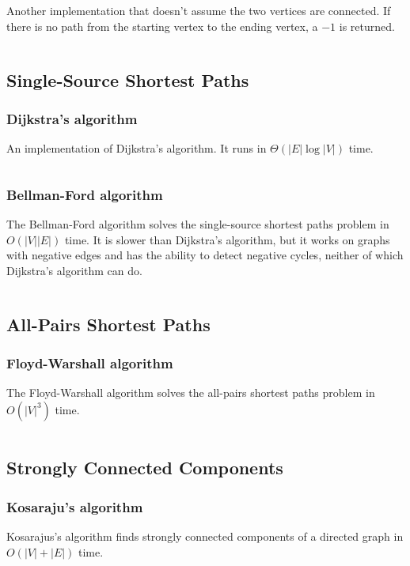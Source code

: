 \documentclass[9pt,a4paper,twocolumn,landscape,oneside]{amsart}
\newcommand{\code}[1]{\inputminted{cpp}{_code/#1}}
\begin{document}
        Another implementation that doesn't assume the two vertices are
        connected. If there is no path from the starting vertex to the ending
        vertex, a $-1$ is returned.
        \code{graph/bfs_visited.cpp}

    \subsection{Single-Source Shortest Paths}
        \subsubsection{Dijkstra's algorithm}
            An implementation of Dijkstra's algorithm. It runs in
            $\Theta(|E|\log{|V|})$ time.
            \code{graph/dijkstra.cpp}

        \subsubsection{Bellman-Ford algorithm}
            The Bellman-Ford algorithm solves the single-source shortest paths
            problem in $O(|V||E|)$ time. It is slower than Dijkstra's
            algorithm, but it works on graphs with negative edges and has the
            ability to detect negative cycles, neither of which Dijkstra's
            algorithm can do.
            \code{graph/bellman_ford.cpp}

    \subsection{All-Pairs Shortest Paths}
        \subsubsection{Floyd-Warshall algorithm}
            The Floyd-Warshall algorithm solves the all-pairs shortest paths
            problem in $O(|V|^3)$ time.
            \code{graph/floyd_warshall.cpp}

    \subsection{Strongly Connected Components}
        \subsubsection{Kosaraju's algorithm}
            Kosarajus's algorithm finds strongly connected components of a
            directed graph in $O(|V|+|E|)$ time.
            \code{graph/scc.cpp}
\end{document}
